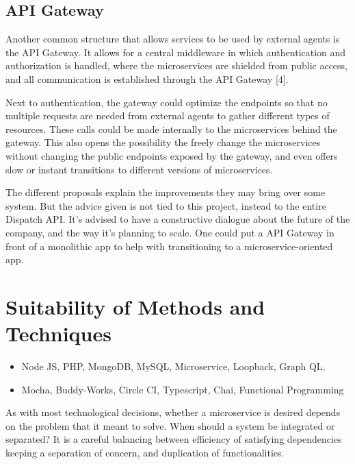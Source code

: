 \clearpage

\subsection{API Gateway}

Another common structure that allows services to be used by external agents is the API Gateway. It allows for a central middleware in which authentication and authorization is handled, where the microservices are shielded from public access, and all communication is established through the API Gateway [4].

Next to authentication, the gateway could optimize the endpoints so that no multiple requests are needed from external agents to gather different types of resources. These calls could be made internally to the microservices behind the gateway. This also opens the possibility the freely change the microservices without changing the public endpoints exposed by the gateway, and even offers slow or instant transitions to different versions of microservices.

The different proposals explain the improvements they may bring over some system. But the advice given is not tied to this project, instead to the entire Dispatch API. It’s advised to have a constructive dialogue about the future of the company, and the way it’s planning to scale. One could put a API Gateway in front of a monolithic app to help with transitioning to a microservice-oriented app.

%
\section{Suitability of Methods and Techniques}
\begin{itemize}
	\item Node JS, PHP, MongoDB, MySQL, Microservice, Loopback, Graph QL,
	\item Mocha, Buddy-Works, Circle CI, Typescript, Chai, Functional Programming
\end{itemize}


As with most technological decisions, whether a microservice is desired depends on the problem that it meant to solve. When should a system be integrated or separated? It is a careful balancing between efficiency of satisfying dependencies keeping a separation of concern, and duplication of functionalities.



